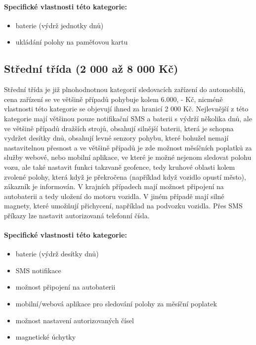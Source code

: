 \documentclass[FM,BP]{tulthesis}  %
\begin{document}
\paragraph{Specifické vlastnosti této kategorie:}
\begin{itemize}
\item baterie (výdrž jednotky dnů)
\item ukládání polohy na paměťovou kartu
\end{itemize}

\subsection{Střední třída (2 000 až 8 000 Kč)}
Střední třída je již plnohodnotnou kategorií sledovacích zařízení do automobilů, cena zařízení se ve většině případů pohybuje kolem 6.000, - Kč, nicméně vlastnosti této kategorie se objevují ihned za hranicí 2 000 Kč. Nejlevnější z této kategorie mají většinou pouze notifikační SMS a baterii s výdrží několika dnů, ale ve většině případů dražších strojů, obsahují silnější baterii, která je schopna vydržet desítky dnů, obsahují levné senzory pohybu, které bohužel nemají nastavitelnou přesnost a ve většině případů je zde možnost měsíčních poplatků za služby webové, nebo mobilní aplikace, ve které je možné nejenom sledovat polohu vozu, ale také nastavit funkci takzvaně geofence, tedy kruhové oblasti kolem zvolené polohy, která když je překročena (například když vozidlo opustí město), zákazník je informován. V krajních případech mají možnost připojení na autobaterii a tedy uložení do motoru vozidla. V jiném případě mají silné magnety, které umožňují přichycení, například na podvozku vozidla. Přes SMS příkazy lze nastavit autorizovaná telefonní čísla.

\paragraph{Specifické vlastnosti této kategorie:}
\begin{itemize}
\item baterie (výdrž desítky dnů)
\item SMS notifikace
\item možnost připojení na autobaterii
\item mobilní/webová aplikace pro sledování polohy za měsíční poplatek
\item možnost nastavení autorizovaných čísel
\item magnetické úchytky
\end{itemize}
\end{document}
